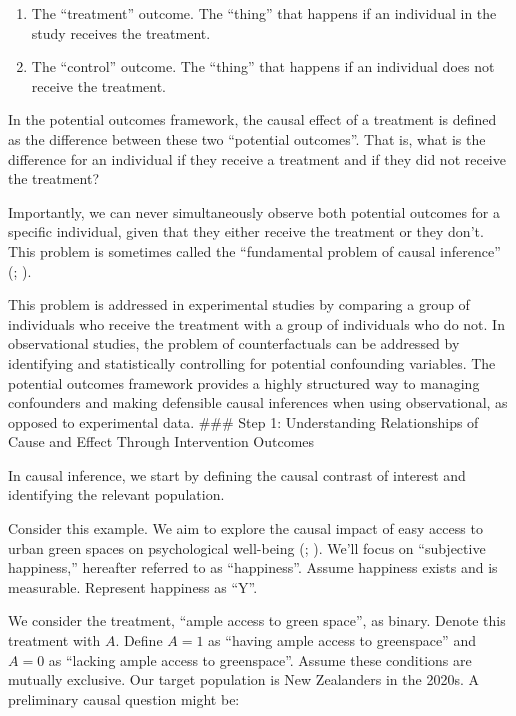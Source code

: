 \documentclass[
  singlecolumn]{article}
\providecommand{\tightlist}{%
  \setlength{\itemsep}{0pt}\setlength{\parskip}{0pt}}\usepackage{longtable,booktabs,array}
\begin{document}
\begin{enumerate}
\def\labelenumi{\arabic{enumi}.}
\tightlist
\item
  The ``treatment'' outcome. The ``thing'' that happens if an individual
  in the study receives the treatment.
\item
  The ``control'' outcome. The ``thing'' that happens if an individual
  does not receive the treatment.
\end{enumerate}

In the potential outcomes framework, the causal effect of a treatment is
defined as the difference between these two ``potential outcomes''. That
is, what is the difference for an individual if they receive a treatment
and if they did not receive the treatment?

Importantly, we can never simultaneously observe both potential outcomes
for a specific individual, given that they either receive the treatment
or they don't. This problem is sometimes called the ``fundamental
problem of causal inference'' (;
).

This problem is addressed in experimental studies by comparing a group
of individuals who receive the treatment with a group of individuals who
do not. In observational studies, the problem of counterfactuals can be
addressed by identifying and statistically controlling for potential
confounding variables. The potential outcomes framework provides a
highly structured way to managing confounders and making defensible
causal inferences when using observational, as opposed to experimental
data. \#\#\# Step 1: Understanding Relationships of Cause and Effect
Through Intervention Outcomes

In causal inference, we start by defining the causal contrast of
interest and identifying the relevant population.

Consider this example. We aim to explore the causal impact of easy
access to urban green spaces on psychological well-being
(;
).
We'll focus on ``subjective happiness,'' hereafter referred to as
``happiness''. Assume happiness exists and is measurable. Represent
happiness as ``Y''.

We consider the treatment, ``ample access to green space'', as binary.
Denote this treatment with \(A\). Define \(A = 1\) as ``having ample
access to greenspace'' and \(A = 0\) as ``lacking ample access to
greenspace''. Assume these conditions are mutually exclusive. Our target
population is New Zealanders in the 2020s. A preliminary causal question
might be:
\end{document}
